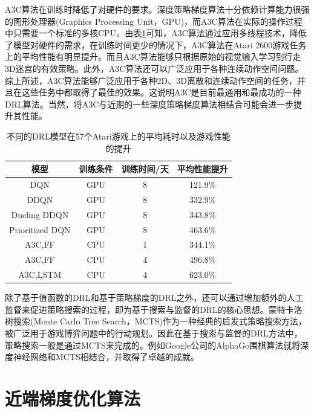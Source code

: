 \documentclass[bachelor]{thesis-uestc}
\begin{document}
	A3C算法在训练时降低了对硬件的要求。深度策略梯度算法十分依赖计算能力很强的图形处理器(Graphics Processing Unit，GPU)，而A3C算法在实际的操作过程中只需要一个标准的多核CPU。由表\ref{tb1}可知，A3C算法通过应用多线程技术，降低了模型对硬件的需求，在训练时间更少的情况下，A3C算法在Atari 2600游戏任务上的平均性能有明显提升。而且A3C算法能够只根据原始的视觉输入学习到行走3D迷宫的有效策略。此外，A3C算法还可以广泛应用于各种连续动作空间问题。综上所述，A3C算法能够广泛应用于各种2D、3D离散和连续动作空间的任务，并且在这些任务中都取得了最佳的效果。这说明A3C是目前最通用和最成功的一种DRL算法。当然，将A3C与近期的一些深度策略梯度算法相结合可能会进一步提升其性能。
	
	\begin{table}[h]
		\caption{不同的DRL模型在57个Atari游戏上的平均耗时以及游戏性能的提升}
		\label{tb1}
		\begin{tabular}{|c|c|c|c|}
			\hline
			模型 & 训练条件 & 训练时间/天 & 平均性能提升 \\
			\hline
			DQN & GPU & 8 & 121.9\% \\
			\hline
			DDQN & GPU & 8 & 332.9\% \\
			\hline
			Dueling DDQN & GPU & 8 & 343.8\% \\
			\hline
			Prioritized DQN & GPU & 8 & 463.6\% \\
			\hline
			A3C,FF & CPU & 1 & 344.1\% \\
			\hline
			A3C,FF & CPU & 4 & 496.8\% \\
			\hline
			A3C,LSTM & CPU & 4 & 623.0\% \\
			\hline
		\end{tabular}
	\end{table}
	除了基于值函数的DRL和基于策略梯度的DRL之外，还可以通过增加额外的人工监督来促进策略搜索的过程，即为基于搜索与监督的DRL的核心思想。蒙特卡洛树搜索(Monte Carlo Tree Search，MCTS)作为一种经典的启发式策略搜索方法，被广泛用于游戏博弈问题中的行动规划。因此在基于搜索与监督的DRL方法中，策略搜索一般是通过MCTS来完成的。例如Google公司的AlphaGo围棋算法就将深度神经网络和MCTS相结合，并取得了卓越的成就。
	
	\section{近端梯度优化算法}
\end{document}
